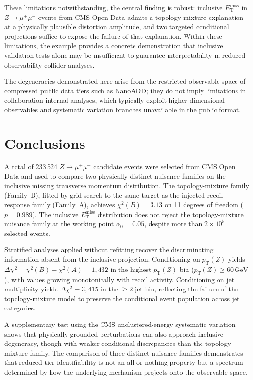 \documentclass[a4paper,11pt]{article}
\newcommand{\MET}{\ensuremath{E_{\mathrm{T}}^{\mathrm{miss}}}\xspace}
\newcommand{\pTZ}{\ensuremath{p_{\mathrm{T}}(Z)}\xspace}
\newcommand{\Dchisq}{\ensuremath{\Delta\chi^2}\xspace}
\newcommand{\zmumu}{\ensuremath{Z\!\to\!\mu^+\mu^-}\xspace}
\begin{document}
These limitations notwithstanding, the central finding is robust: inclusive
\MET in \zmumu events from CMS Open Data admits a topology-mixture
explanation at a physically plausible distortion amplitude, and two targeted
conditional projections suffice to expose the failure of that explanation.
Within these limitations, the example provides a concrete demonstration that
inclusive validation tests alone may be insufficient to guarantee
interpretability in reduced-observability collider analyses.

The degeneracies demonstrated here arise from the restricted observable
space of compressed public data tiers such as NanoAOD; they do not imply
limitations in collaboration-internal analyses, which typically exploit
higher-dimensional observables and systematic variation branches unavailable
in the public format.

\section{Conclusions}
\label{sec:conclusions}

A total of 233\,524 \zmumu candidate events were selected from CMS Open
Data and used to compare two physically distinct nuisance families on the
inclusive missing transverse momentum distribution.
The topology-mixture family (Family~B), fitted by grid search to the same
target as the injected recoil-response family (Family~A), achieves
$\chi^2(B) = 3.13$ on 11 degrees of freedom ($p = 0.989$).
The inclusive \MET distribution does not reject the topology-mixture
nuisance family at the working point $\alpha_0 = 0.05$, despite more than
$2 \times 10^5$ selected events.

Stratified analyses applied without refitting recover the discriminating
information absent from the inclusive projection.
Conditioning on \pTZ yields $\Dchisq = \chi^2(B) - \chi^2(A) = 1{,}432$
in the highest \pTZ bin ($\pTZ \geq 60\,\mathrm{GeV}$), with values
growing monotonically with recoil activity.
Conditioning on jet multiplicity yields $\Dchisq = 3{,}415$ in the
$\geq\!2$-jet bin, reflecting the failure of the topology-mixture model to
preserve the conditional event population across jet categories.

A supplementary test using the CMS unclustered-energy systematic variation
shows that physically grounded perturbations can also approach inclusive
degeneracy, though with weaker conditional discrepancies than the
topology-mixture family.
The comparison of three distinct nuisance families demonstrates that
reduced-tier identifiability is not an all-or-nothing property but a
spectrum determined by how the underlying mechanism projects onto the
observable space.
\end{document}
